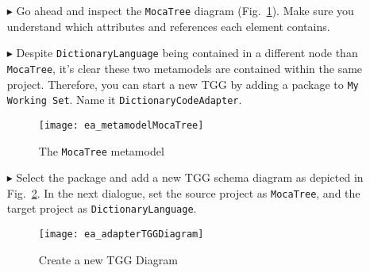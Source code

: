 \begin{itemize}

\item[$\blacktriangleright$] Go ahead and inspect the \texttt{MocaTree} diagram (Fig.~\ref{ea:mocaTree}). Make sure you understand which attributes and
references each element contains.

\item[$\blacktriangleright$] Despite \texttt{DictionaryLanguage} being contained in a different node than \texttt{MocaTree}, it's clear these two metamodels are
contained within the same project. Therefore, you can start a new TGG by adding a package to \texttt{My Working Set}. Name it
\texttt{Dict\-ion\-ary\-Code\-Adap\-ter}.

\newpage

\begin{figure}[htpb]
\begin{center}
  \texttt{[image: ea\_metamodelMocaTree]}
  \caption{The \texttt{MocaTree} metamodel}
  \label{ea:mocaTree}
\end{center}
\end{figure}

\vspace{1cm}

\item[$\blacktriangleright$] Select the package and add a new TGG schema diagram as depicted in Fig.~\ref{ea:newTGGDiagram}. In the next dialogue,
set the source project as \texttt{MocaTree}, and the target project as \texttt{Dict\-ion\-ary\-Lang\-uage}.

\vspace{1cm}

\begin{figure}[htpb]
\begin{center}
  \texttt{[image: ea\_adapterTGGDiagram]}
  \caption{Create a new TGG Diagram}
  \label{ea:newTGGDiagram}
\end{center}
\end{figure}

\end{itemize}

\clearpage

